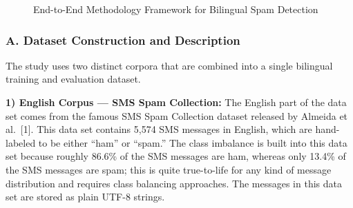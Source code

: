 \begin{figure}[htbp]
\caption{End-to-End Methodology Framework for Bilingual Spam Detection}
\label{fig:methodology}
\end{figure}

\subsubsection{A. Dataset Construction and
Description}\label{a.-dataset-construction-and-description}

The study uses two distinct corpora that are combined into a single
bilingual training and evaluation dataset.

\textbf{1) English Corpus --- SMS Spam Collection:} The English part of
the data set comes from the famous SMS Spam Collection dataset released
by Almeida et al.~{[}1{]}. This data set contains 5,574 SMS messages in
English, which are hand-labeled to be either ``ham'' or ``spam.'' The
class imbalance is built into this data set because roughly 86.6\% of
the SMS messages are ham, whereas only 13.4\% of the SMS messages are
spam; this is quite true-to-life for any kind of message distribution
and requires class balancing approaches. The messages in this data set
are stored as plain UTF-8 strings.

